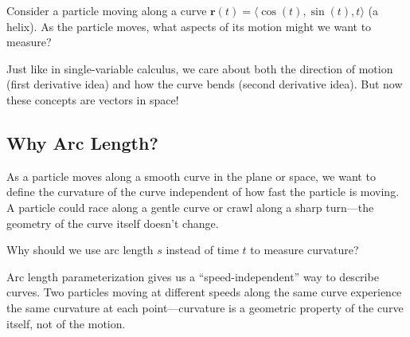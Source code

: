 \documentclass{ximera}
\begin{document}
\begin{problem}
Consider a particle moving along a curve $\mathbf{r}(t) = \langle \cos(t), \sin(t), t \rangle$ (a helix). As the particle moves, what aspects of its motion might we want to measure?

\begin{selectAll}
\end{selectAll}

\begin{feedback}
Just like in single-variable calculus, we care about both the direction of motion (first derivative idea) and how the curve bends (second derivative idea). But now these concepts are vectors in space!
\end{feedback}
\end{problem}

\subsection*{Why Arc Length?}

As a particle moves along a smooth curve in the plane or space, we want to define the curvature of the curve independent of how fast the particle is moving. A particle could race along a gentle curve or crawl along a sharp turn—the geometry of the curve itself doesn't change.

\begin{problem}
Why should we use arc length $s$ instead of time $t$ to measure curvature?

\begin{multipleChoice}
\end{multipleChoice}

\begin{feedback}
Arc length parameterization gives us a ``speed-independent'' way to describe curves. Two particles moving at different speeds along the same curve experience the same curvature at each point—curvature is a geometric property of the curve itself, not of the motion.
\end{feedback}
\end{problem}
\end{document}
